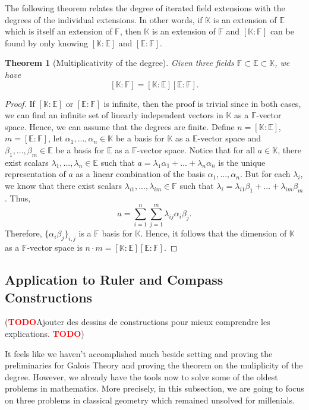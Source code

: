 \documentclass{article}
\theoremstyle{plain}
\newtheorem{theorem}{Theorem}[subsection]
\theoremstyle{definition}
\newcommand{\F}{\mathbb{F}}
\newcommand{\E}{\mathbb{E}}
\newcommand{\K}{\mathbb{K}}
\newcommand{\td}{\textcolor{red}{\textbf{TODO}}}
\begin{document}
The following theorem relates the degree of iterated field extensions with the degrees of the individual extensions. In other words, if $\K$ is an extension of $\E$ which is itself an extension of $\F$, then $\K$ is an extension of $\F$ and $[\K : \F]$ can be found by only knowing $[\K : \E]$ and $[\E : \F]$.

\begin{theorem}[Multiplicativity of the degree]
    Given three fields $\F \subset \E \subset \K$, we have
    $$[\K : \F] = [\K : \E] [\E : \F].$$
\end{theorem}

\begin{proof}
    If $[\K : \E]$ or $[\E : \F]$ is infinite, then the proof is trivial since in both cases, we can find an infinite set of linearly independent vectors in $\K$ as a $\F$-vector space. Hence, we can assume that the degrees are finite. Define $n = [\K : \E]$, $m = [\E : \F]$, let $\alpha_1, ..., \alpha_n \in \K$ be a basis for $\K$ as a $\E$-vector space and $\beta_1, ..., \beta_m \in \E$ be a basis for $\E$ as a $\F$-vector space. Notice that for all $a \in \K$, there exist scalars $\lambda_1, ..., \lambda_n \in \E$ such that $a = \lambda_1 \alpha_1  + ... + \lambda_n \alpha_n$ is the unique representation of $a$ as a linear combination of the basis $\alpha_1, ..., \alpha_n$. But for each $\lambda_i$, we know that there exist scalars $\lambda_{i1}, ..., \lambda_{im} \in \F$ such that  $\lambda_i = \lambda_{i1}\beta_1 + ... + \lambda_{im}\beta_m$. Thus,
    $$a = \sum_{i=1}^{n}\sum_{j=1}^{m}\lambda_{ij}\alpha_i \beta_j.$$
    Therefore, $\{\alpha_i \beta_j\}_{i,j}$ is a $\F$ basis for $\K$. Hence, it follows that the dimension of $\K$ as a $\F$-vector space is $n\cdot m = [\K : \E] [\E : \F]$.
\end{proof}

\subsection{Application to Ruler and Compass Constructions}

(\td Ajouter des dessins de constructions pour mieux comprendre les explications. \td)

It feels like we haven't accomplished much beside setting and proving the preliminaries for Galois Theory and proving the theorem on the muliplicity of the degree. However, we already have the tools now to solve some of the oldest problems in mathematics. More precisely, in this subsection, we are going to focus on three problems in classical geometry which remained unsolved for millenials.
\end{document}
